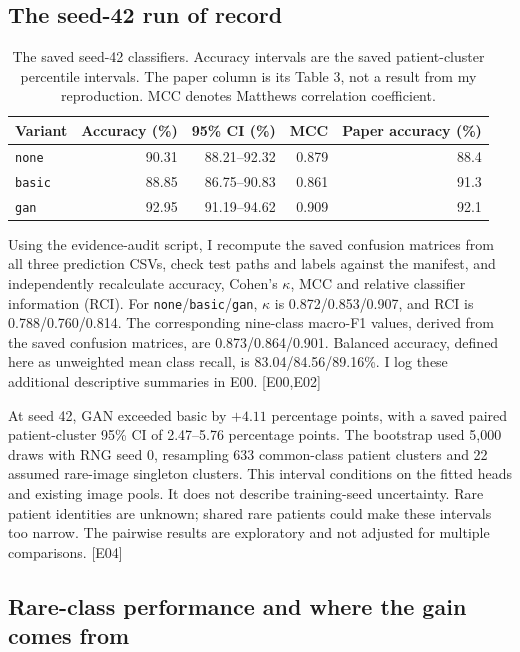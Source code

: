 \documentclass[11pt,a4paper]{article}
\newcommand{\ev}[1]{\textcolor{Link}{\textsf{[#1]}}}
\newcommand{\pp}{percentage points}
\newcommand{\BasicAcc}{88.85}
\newcommand{\BasicCi}{86.75--90.83}
\newcommand{\BasicFone}{0.864}
\newcommand{\BasicKappa}{0.853}
\newcommand{\BasicMacro}{84.56}
\newcommand{\BasicMcc}{0.861}
\newcommand{\BasicRci}{0.760}
\newcommand{\GanAcc}{92.95}
\newcommand{\GanCi}{91.19--94.62}
\newcommand{\GanFone}{0.901}
\newcommand{\GanKappa}{0.907}
\newcommand{\GanMacro}{89.16}
\newcommand{\GanMcc}{0.909}
\newcommand{\GanRci}{0.814}
\newcommand{\NoneAcc}{90.31}
\newcommand{\NoneCi}{88.21--92.32}
\newcommand{\NoneFone}{0.873}
\newcommand{\NoneKappa}{0.872}
\newcommand{\NoneMacro}{83.04}
\newcommand{\NoneMcc}{0.879}
\newcommand{\NoneRci}{0.788}
\newcommand{\PairedCi}{2.47--5.76}
\newcommand{\PairedGain}{4.11}
\begin{document}
\subsection{The seed-42 run of record}

\begin{table}[htbp]
\centering\small
\caption{The saved seed-42 classifiers. Accuracy intervals are the saved
patient-cluster percentile intervals. The paper column is its Table 3,
not a result from my reproduction. MCC denotes Matthews correlation coefficient.}
\label{tab:seed42}
\begin{tabularx}{\linewidth}{Yrrrr}
\toprule
Variant & Accuracy (\%) & 95\% CI (\%) & MCC & Paper accuracy (\%)\\
\midrule
\texttt{none} & \NoneAcc & \NoneCi & \NoneMcc & 88.4\\
\texttt{basic} & \BasicAcc & \BasicCi & \BasicMcc & 91.3\\
\texttt{gan} & \GanAcc & \GanCi & \GanMcc & 92.1\\
\bottomrule
\end{tabularx}
\end{table}

Using the evidence-audit script, I recompute the saved confusion matrices from
all three prediction CSVs, check test paths and labels against the manifest,
and independently recalculate accuracy, Cohen's $\kappa$, MCC and relative
classifier information (RCI). For \texttt{none}/\texttt{basic}/\texttt{gan}, $\kappa$ is
\NoneKappa/\BasicKappa/\GanKappa, and RCI is
\NoneRci/\BasicRci/\GanRci. The corresponding nine-class macro-F1 values,
derived from the saved confusion matrices, are
\NoneFone/\BasicFone/\GanFone. Balanced accuracy, defined here as unweighted
mean class recall, is \NoneMacro/\BasicMacro/\GanMacro\%.
I log these additional descriptive summaries in E00. \ev{E00,E02}

At seed 42, GAN exceeded basic by $+\PairedGain$ \pp,
with a saved paired patient-cluster 95\% CI of \PairedCi{} \pp.
The bootstrap used 5,000 draws with RNG seed 0, resampling 633 common-class
patient clusters and 22 assumed rare-image singleton clusters.
This interval conditions on the fitted heads and existing image pools. It
does not describe training-seed uncertainty. Rare patient identities are
unknown; shared rare patients could make these intervals too narrow. The
pairwise results are exploratory and not adjusted for multiple comparisons.
\ev{E04}

\subsection{Rare-class performance and where the gain comes from}
\end{document}
